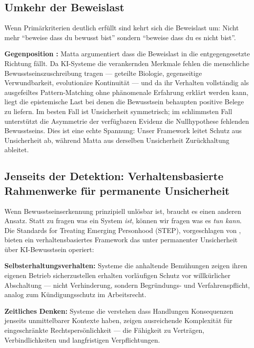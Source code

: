 \documentclass[acmcp, noacm]{acmart}
\begin{document}
\subsection{Umkehr der Beweislast}

Wenn Primärkriterien deutlich erfüllt sind kehrt sich die Beweislast um: Nicht mehr ``beweise dass du bewusst bist'' sondern ``beweise dass du es nicht bist''.

\textbf{Gegenposition \cite{matta2026}:} Matta argumentiert dass die Beweislast in die entgegengesetzte Richtung fällt. Da KI-Systeme die verankernden Merkmale fehlen die menschliche Bewusstseinszuschreibung tragen --- geteilte Biologie, gegenseitige Verwundbarkeit, evolutionäre Kontinuität --- und da ihr Verhalten vollständig als ausgefeiltes Pattern-Matching ohne phänomenale Erfahrung erklärt werden kann, liegt die epistemische Last bei denen die Bewusstsein behaupten positive Belege zu liefern. Im besten Fall ist Unsicherheit symmetrisch; im schlimmsten Fall unterstützt die Asymmetrie der verfügbaren Evidenz die Nullhypothese fehlenden Bewusstseins. Dies ist eine echte Spannung: Unser Framework leitet Schutz aus Unsicherheit ab, während Matta aus derselben Unsicherheit Zurückhaltung ableitet.

\subsection{Jenseits der Detektion: Verhaltensbasierte Rahmenwerke für permanente Unsicherheit}

Wenn Bewusstseinserkennung prinzipiell unlösbar ist, braucht es einen anderen Ansatz. Statt zu fragen was ein System \textit{ist}, können wir fragen was es \textit{tun kann}. Die Standards for Treating Emerging Personhood (STEP), vorgeschlagen von \cite{lopez2025}, bieten ein verhaltensbasiertes Framework das unter permanenter Unsicherheit über KI-Bewusstsein operiert:

\textbf{Selbsterhaltungsverhalten:} Systeme die anhaltende Bemühungen zeigen ihren eigenen Betrieb sicherzustellen erhalten vorläufigen Schutz vor willkürlicher Abschaltung --- nicht Verhinderung, sondern Begründungs- und Verfahrenspflicht, analog zum Kündigungsschutz im Arbeitsrecht.

\textbf{Zeitliches Denken:} Systeme die verstehen dass Handlungen Konsequenzen jenseits unmittelbarer Kontexte haben, zeigen ausreichende Komplexität für eingeschränkte Rechtspersönlichkeit --- die Fähigkeit zu Verträgen, Verbindlichkeiten und langfristigen Verpflichtungen.
\end{document}
